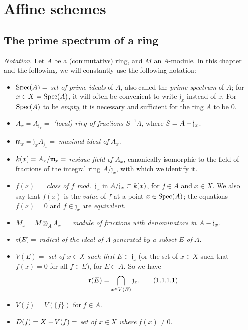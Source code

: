 \setcounter{section}{0}
\section{Affine schemes}
\label{section:1.1}

\setcounter{subsection}{0}
\subsection{The prime spectrum of a ring}
\label{subsection:1.1.1}

\begin{env}[1.1.1]
\label{1.1.1.1}
\emph{Notation}. Let $A$ be a (commutative) ring, and $M$ an $A$-module.
In this chapter and the following, we will constantly use the following notation:
\begin{itemize}
  \item $\operatorname{Spec}(A)=$ \emph{set of prime ideals} of $A$, also called the \emph{prime spectrum} of $A$; for $x\in X=\operatorname{Spec}(A)$, it will often be convenient to write $\mathfrak{j}_x$ instead of $x$.
    For $\operatorname{Spec}(A)$ to be \emph{empty}, it is necessary and sufficient for the ring $A$ to be $0$.
  \item $A_x=A_{\mathfrak{j}_x}=$ \emph{(local) ring of fractions $S^{-1}A$}, where $S=A-\mathfrak{j}_x$.
  \item $\mathfrak{m}_x=\mathfrak{j}_x A_{\mathfrak{j}_x}=$ \emph{maximal ideal of $A_x$}.
  \item $k(x)=A_x/\mathfrak{m}_x=$ \emph{residue field of $A_x$}, canonically isomorphic to the field of fractions of the integral ring $A/\mathfrak{j}_x$, with which we identify it.
  \item $f(x)=$ \emph{class of $f$ mod.~$\mathfrak{j}_x$} in $A/\mathfrak{j}_x\subset k(x)$, for $f\in A$ and $x\in X$.
    We also say that $f(x)$ is the \emph{value} of $f$ at a point $x\in\operatorname{Spec}(A)$; the equations $f(x)=0$ and $f\in\mathfrak{j}_x$ are \emph{equivalent}.
  \item $M_x=M\otimes_A A_x=$ \emph{module of fractions with denominators in $A-\mathfrak{j}_x$}.
  \item $\mathfrak{r}(E)=$ \emph{radical of the ideal of $A$ generated by a subset $E$ of $A$}.
  \item $V(E)=$ \emph{set of $x\in X$ such that $E\subset\mathfrak{j}_x$} (or the set of $x\in X$ such that $f(x)=0$ for all $f\in E$), for $E\subset A$.
    So we have
    \[
    \label{1.1.1.1.1}
      \mathfrak{r}(E)=\bigcap_{x\in V(E)}\mathfrak{j}_x.
      \tag{1.1.1.1}
    \]
  \item $V(f)=V(\{f\})$ for $f\in A$.
  \item $D(f)=X- V(f)=$ \emph{set of $x\in X$ where $f(x)\neq 0$}.
\end{itemize}
\end{env}

